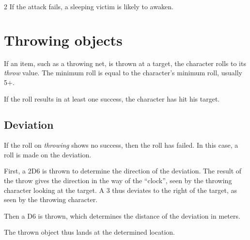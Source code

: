 \begin{multicols}{2}
If the attack fails, a sleeping victim is likely to awaken.

\section{Throwing objects}
\label{sec:throwing}

If an item, such as a throwing net, is thrown at a target, the character rolls to its \textit{throw} value. The minimum roll is equal to the character's minimum roll, usually 5+.

If the roll results in at least one success, the character has hit his target.

\subsection{Deviation}

If the roll on \textit{throwing} shows no success, then the roll has failed. In this case, a roll is made on the deviation.

First, a 2D6 is thrown to determine the direction of the deviation. The result of the throw gives the direction in the way of the ``clock'', seen by the throwing character looking at the target. A 3 thus deviates to the right of the target, as seen by the throwing character.

Then a D6 is thrown, which determines the distance of the deviation in meters.

The thrown object thus lands at the determined location.
\end{multicols}
